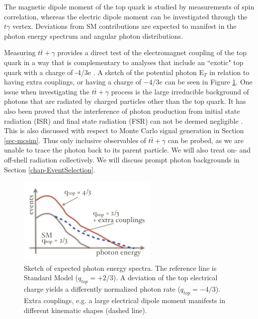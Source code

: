 The magnetic dipole moment of the top quark is studied by measurements of spin correlation, whereas the electric dipole moment can be investigated through the $t\gamma$ vertex. Deviations from SM contributions are expected to manifest in the photon energy spectrum and angular photon distributions.

Measuring $t\bar{t}+\gamma$ provides a direct test of the electromagnet coupling of the top quark in a way that is complementary to analyses that include an ``exotic" top quark with a charge of -4/3e \cite{top-charge}. A sketch of the potential photon E$_T$ in relation to having extra couplings, or having a charge of $-4/3e$ can be seen in Figure \ref{fig-TopChargeSketch}. One issue when investigating the $t\bar{t}+\gamma$ process is the large irreducible background of photons that are radiated by charged particles other than the top quark. It has also been proved that the interference of photon production from initial state radiation (ISR) and final state radiation (FSR) can not be deemed negligible \cite{topchargemeasurement}. This is also discussed with respect to Monte Carlo signal generation in Section \ref{sec-mcsim}. Thus only inclusive observables of $t\bar{t}+\gamma$ can be probed, as we are unable to trace the photon back to its parent particle. We will also treat on- and off-shell radiation collectively. We will discuss prompt photon backgrounds in Section \ref{chap-EventSelection}. 

\begin{figure} \label{fig-TopChargeSketch}
\begin{center}
\includegraphics[width=0.6\textwidth]{Figures/TopChargeHeiner.png}
\caption{Sketch of expected photon energy spectra. The reference line is Standard Model ($q_{top} = +2/3$). A deviation of the top electrical charge yields a differently normalized photon rate ($q_{top} = −4/3$). Extra couplings, e.g. a large electrical dipole moment manifests in different kinematic shapes (dashed line). \cite{heinerthesis}}
\end{center}
\end{figure}

